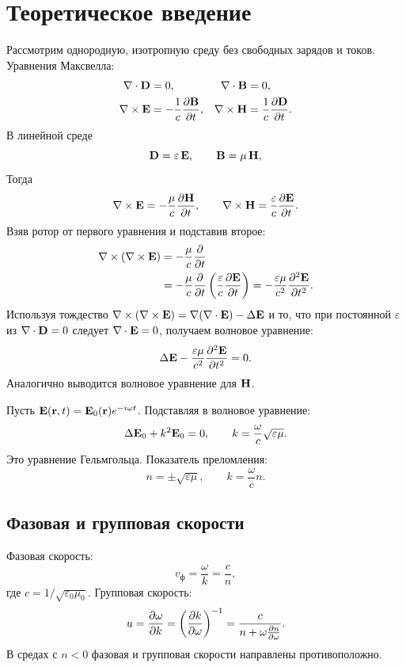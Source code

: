 \documentclass[a4paper,12pt]{article}
\begin{document}
\section{Теоретическое введение}
Рассмотрим однородную, изотропную среду без свободных зарядов и токов. Уравнения Максвелла:
\begin{align}
    \nabla \cdot \vb{D} &= 0, & \nabla \cdot \vb{B} &= 0, \\
    \nabla \times \vb{E} &= -\frac{1}{c}\pdv{\vb{B}}{t}, &
    \nabla \times \vb{H} &= \frac{1}{c}\pdv{\vb{D}}{t}.
\end{align}
В линейной среде
\[
\vb{D}=\varepsilon\,\vb{E},\qquad \vb{B}=\mu\,\vb{H},
\]
Тогда
\begin{equation}
    \nabla \times \vb{E} = -\frac{\mu}{c}\pdv{\vb{H}}{t}, \qquad
    \nabla \times \vb{H} = \frac{\varepsilon}{c}\pdv{\vb{E}}{t}.
\end{equation}
Взяв ротор от первого уравнения и подставив второе:
\begin{align*}
    \nabla \times (\nabla \times \vb{E})
    &= -\frac{\mu}{c}\pdv{}{t}(\nabla \times \vb{H}) \\
    &= -\frac{\mu}{c}\pdv{}{t}\left(\frac{\varepsilon}{c}\pdv{\vb{E}}{t}\right)
     = -\frac{\varepsilon\mu}{c^2}\pdv[2]{\vb{E}}{t}.
\end{align*}
Используя тождество $\nabla \times (\nabla \times \vb{E}) = \nabla(\nabla \cdot \vb{E}) - \Delta \vb{E}$ и то, что при постоянной $\varepsilon$
из $\nabla\cdot\vb{D}=0$ следует $\nabla\cdot\vb{E}=0$, получаем волновое уравнение:
\begin{equation}
    \Delta \vb{E} - \frac{\varepsilon\mu}{c^2}\pdv[2]{\vb{E}}{t} = 0.
\end{equation}
Аналогично выводится волновое уравнение для $\vb{H}$.

Пусть $\vb{E}(\vb{r},t) = \vb{E}_0(\vb{r})e^{-i\omega t}$. Подставляя в волновое уравнение:
\begin{equation}
    \Delta \vb{E}_0 + k^2 \vb{E}_0 = 0, \qquad
    k = \frac{\omega}{c}\sqrt{\varepsilon\mu}.
\end{equation}
Это уравнение Гельмгольца. Показатель преломления:
\[
n=\pm\sqrt{\varepsilon\mu},\qquad k=\frac{\omega}{c}n.
\]

\subsection{Фазовая и групповая скорости}
Фазовая скорость:
\begin{equation}
    v_{\text{ф}} = \frac{\omega}{k} = \frac{c}{n},
\end{equation}
где $c = 1/\sqrt{\varepsilon_0 \mu_0}$. Групповая скорость:
\begin{equation}
    u = \pdv{\omega}{k} = \left(\pdv{k}{\omega}\right)^{-1} = \frac{c}{n + \omega \pdv{n}{\omega}}.
\end{equation}
В средах с $n<0$ фазовая и групповая скорости направлены противоположно.
\end{document}
